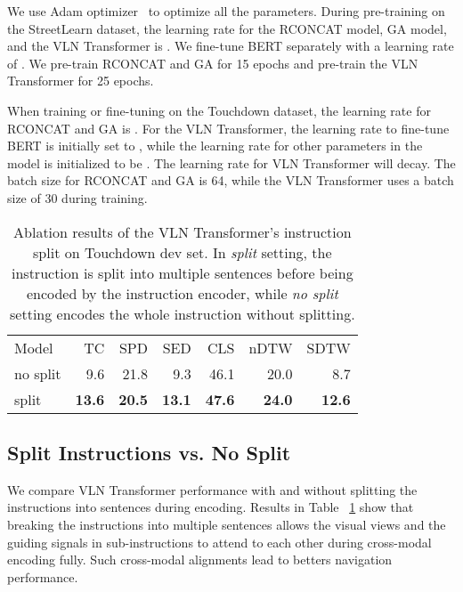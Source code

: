 \documentclass[11pt,a4paper]{article}
\begin{document}
We use Adam optimizer~\cite{kingma2014adam} to optimize all the parameters. During pre-training on the StreetLearn dataset, the learning rate for the RCONCAT model, GA model, and the VLN Transformer is . We fine-tune BERT separately with a learning rate of . We pre-train RCONCAT and GA for 15 epochs and pre-train the VLN Transformer for 25 epochs.

When training or fine-tuning on the Touchdown dataset, the learning rate for RCONCAT and GA is . For the VLN Transformer, the learning rate to fine-tune BERT is initially set to , while the learning rate for other parameters in the model is initialized to be . The learning rate for VLN Transformer will decay.
The batch size for RCONCAT and GA is 64, while the VLN Transformer uses a batch size of 30 during training.




\begin{table}[h]
\begin{adjustbox}{width=\linewidth,center}
\begin{tabular}{l | r r r r r r }
\cmidrule[\heavyrulewidth]{1-7}
Model & TC    & SPD   & SED   & CLS  & nDTW     & SDTW  \\ \cmidrule[\heavyrulewidth]{1-7}
no split & 9.6  & 21.8  & 9.3  & 46.1 & 20.0      &  8.7  \\ split & \textbf{13.6}  & \textbf{20.5}  & \textbf{13.1}  & \textbf{47.6} & \textbf{24.0}      & \textbf{12.6}   \\ 
\cmidrule[\heavyrulewidth]{1-7}
\end{tabular}
\end{adjustbox}
\caption{Ablation results of the VLN Transformer's instruction split on Touchdown dev set. In \textit{split} setting, the instruction is split into multiple sentences before being encoded by the instruction encoder, while \textit{no split} setting encodes the whole instruction without splitting.}
\label{tab:split}
\end{table}

\subsection{Split Instructions vs. No Split~}
We compare VLN Transformer performance with and without splitting the instructions into sentences during encoding. Results in Table ~\ref{tab:split} show that breaking the instructions into multiple sentences allows the visual views and the guiding signals in sub-instructions to attend to each other during cross-modal encoding fully. Such cross-modal alignments lead to betters navigation performance.
\end{document}
